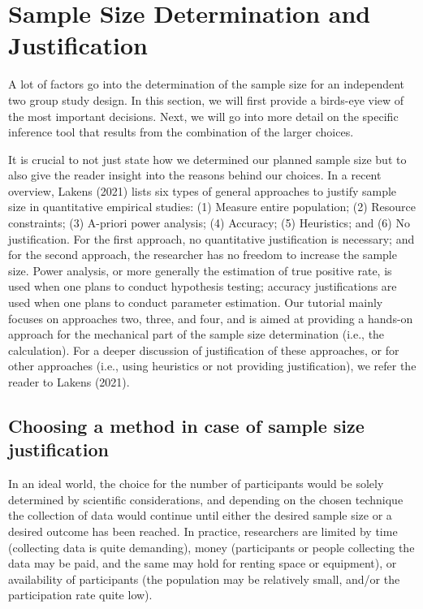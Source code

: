 \documentclass[
  english,
  man,floatsintext]{apa6}
\begin{document}
\hypertarget{sample-size-determination-and-justification}{%
\section{Sample Size Determination and Justification}\label{sample-size-determination-and-justification}}

A lot of factors go into the determination of the sample size for an independent two group study design. In this section, we will first provide a birds-eye view of the most important decisions. Next, we will go into more detail on the specific inference tool that results from the combination of the larger choices.

It is crucial to not just state how we determined our planned sample size but to also give the reader insight into the reasons behind our choices. In a recent overview, Lakens (2021) lists six types of general approaches to justify sample size in quantitative empirical studies: (1) Measure entire population; (2) Resource constraints; (3) A-priori power analysis; (4) Accuracy; (5) Heuristics; and (6) No justification. For the first approach, no quantitative justification is necessary; and for the second approach, the researcher has no freedom to increase the sample size. Power analysis, or more generally the estimation of true positive rate, is used when one plans to conduct hypothesis testing; accuracy justifications are used when one plans to conduct parameter estimation. Our tutorial mainly focuses on approaches two, three, and four, and is aimed at providing a hands-on approach for the mechanical part of the sample size determination (i.e., the calculation). For a deeper discussion of justification of these approaches, or for other approaches (i.e., using heuristics or not providing justification), we refer the reader to Lakens (2021).

\hypertarget{choosing-a-method-in-case-of-sample-size-justification}{%
\subsection{Choosing a method in case of sample size justification}\label{choosing-a-method-in-case-of-sample-size-justification}}

In an ideal world, the choice for the number of participants would be solely determined by scientific considerations, and depending on the chosen technique the collection of data would continue until either the desired sample size or a desired outcome has been reached. In practice, researchers are limited by time (collecting data is quite demanding), money (participants or people collecting the data may be paid, and the same may hold for renting space or equipment), or availability of participants (the population may be relatively small, and/or the participation rate quite low).
\end{document}
